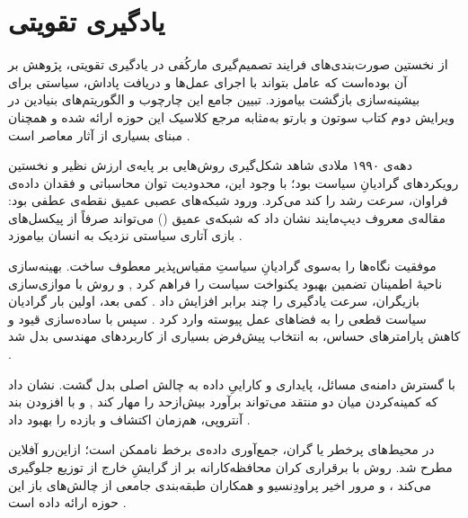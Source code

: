 \section{یادگیری تقویتی}


از نخستین صورت‌بندی‌های فرایند تصمیم‌گیری مارکُفی در یادگیری تقویتی، پژوهش بر آن بوده‌است که عامل بتواند با اجرای عمل‌ها و دریافت پاداش، سیاستی برای بیشینه‌سازی بازگشت بیاموزد. تبیین جامع این چارچوب و الگوریتم‌های بنیادین در ویرایش دوم کتاب سوتون و بارتو به‌مثابه مرجع کلاسیک این حوزه ارائه شده و همچنان مبنای بسیاری از آثار معاصر است \cite{SuttonBarto2018}. %

\noindent
دهه‌‌ی ۱۹۹۰ ملادی شاهد شکل‌گیری روش‌هایی بر پایه‌ی ارزش
 نظیر  و نخستین رویکردهای گرادیانِ سیاست بود؛ با وجود این، محدودیت توان محاسباتی و فقدان داده‌ی فراوان، سرعت رشد را کند می‌کرد. ورود شبکه‌های عصبی عمیق نقطه‌ی عطفی بود: مقاله‌ی معروف دیپ‌مایند
  نشان داد که شبکه‌ی  عمیق () می‌تواند صرفاً از پیکسل‌های بازی آتاری سیاستی نزدیک به انسان بیاموزد \cite{Mnih2015}. %

\noindent
موفقیت  نگاه‌ها را به‌سوی گرادیانِ سیاستِ مقیاس‌پذیر معطوف ساخت. بهینه‌سازی ناحیهٔ اطمینان
  تضمین بهبود یکنواخت سیاست را فراهم کرد \cite{Schulman2015TRPO}, و روش  با موازی‌سازی بازیگران، سرعت یادگیری را چند برابر افزایش داد \cite{Mnih2016A3C}. %
کمی بعد،  اولین بار گرادیان سیاست قطعی را به فضاهای عمل پیوسته وارد کرد \cite{Lillicrap2015DDPG}. %
سپس  با ساده‌سازی قیود  و کاهش پارامترهای حساس، به انتخاب پیش‌فرض بسیاری از کاربردهای مهندسی بدل شد \cite{Schulman2017PPO}. %

\noindent
با گسترش دامنه‌ی مسائل، پایداری و کاراییِ داده به چالش اصلی بدل گشت.  نشان داد که کمینه‌کردن میان دو منتقد می‌تواند برآورد بیش‌از‌حد  را مهار کند \cite{Fujimoto2018TD3}, و  با افزودن بند آنتروپی، هم‌زمان اکتشاف و بازده را بهبود داد \cite{Haarnoja2018SAC}. %

\noindent

\noindent
در محیط‌های پرخطر یا گران، جمع‌آوری داده‌ی برخط ناممکن است؛ ازاین‌رو  آفلاین مطرح شد. روش  با برقراری کران محافظه‌کارانه بر  از گرایشِ خارج از توزیع جلوگیری می‌کند \cite{Kumar2020CQL}، و مرور اخیر پراودِنسیو و همکاران طبقه‌بندی جامعی از چالش‌های باز این حوزه ارائه داده است \cite{Prudencio2022OfflineSurvey}. %

